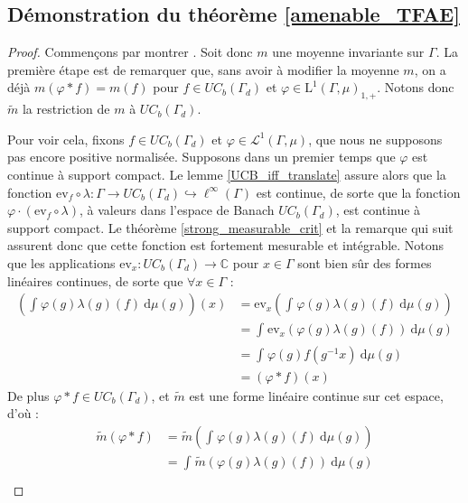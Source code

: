 \documentclass[a4paper,12pt]{article}
\newcommand{\C}{\mathbb{C}}
\newcommand{\ev}{\mathrm{ev}}
\newcommand{\integral}[4]{\int_{#1}^{#2} #3~\mathrm{d}#4}
\newcommand{\inv}{^{-1}}
\newcommand{\comp}{\circ}
\renewcommand{\implies}{\Rightarrow}
\begin{document}
\subsection{Démonstration du théorème \ref{amenable_TFAE}} 

\begin{proof}
    Commençons par montrer \framebox{$(\ref{amenable_TFAE/amenable})\implies(\ref{amenable_TFAE/topological_mean})$}. Soit donc 
    $m$ une moyenne invariante sur $\Gamma$. La première étape est de remarquer que, sans avoir à modifier la moyenne 
    $m$, on a déjà $m(\varphi\ast f) = m(f)$ pour $f\in UC_b(\Gamma_d)$ et $\varphi\in\mathrm{L}^1(\Gamma, \mu)_{1, +}$.
    Notons donc $\widetilde{m}$ la restriction de $m$ à $UC_b(\Gamma_d)$.

    Pour voir cela, fixons $f\in UC_b(\Gamma_d)$ et $\varphi\in\mathscr{L}^1(\Gamma, \mu)$, que nous ne supposons pas encore positive normalisée.
    Supposons dans un premier temps que $\varphi$ est continue à support compact. Le lemme \ref{UCB_iff_translate} assure 
    alors que la fonction $\ev_f\comp\lambda:\Gamma\to UC_b(\Gamma_d)\hookrightarrow\ell^\infty(\Gamma)$ est continue,
    de sorte que la fonction $\varphi\cdot(\ev_f\comp\lambda)$, à valeurs dans l'espace de Banach $UC_b(\Gamma_d)$, est continue à support compact.
    Le théorème \ref{strong_measurable_crit} et la remarque qui suit assurent donc que cette fonction est fortement mesurable et intégrable.
    Notons que les applications $\ev_x:UC_b(\Gamma_d)\to\C$ pour $x\in\Gamma$ sont bien sûr des formes linéaires continues, de sorte que $\forall x\in\Gamma$ :
    \begin{align*}
        \left(\integral{}{}{\varphi(g)\lambda(g)(f)}{\mu(g)}\right)(x) 
            &= \ev_x\left(\integral{}{}{\varphi(g)\lambda(g)(f)}{\mu(g)}\right) \\
            &= \integral{}{}{\ev_x(\varphi(g)\lambda(g)(f))}{\mu(g)} \\
            &= \integral{}{}{\varphi(g)f(g\inv x)}{\mu(g)} \\
            &= (\varphi\ast f)(x)
    \end{align*}
    De plus $\varphi\ast f\in UC_b(\Gamma_d)$, et $\widetilde{m}$ est une forme linéaire continue sur cet espace, d'où :
    \begin{align*}
        \widetilde{m}(\varphi\ast f) 
            &= \widetilde{m}\left(\integral{}{}{\varphi(g)\lambda(g)(f)}{\mu(g)}\right) \\
            &= \integral{}{}{\widetilde{m}(\varphi(g)\lambda(g)(f))}{\mu(g)} \\

\end{align*}
\end{proof}
\end{document}
